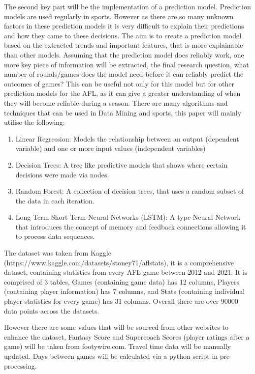 \documentclass{imc-inf}
\begin{document}
	The second key part will be the implementation of a prediction model. Prediction models are used regularly in sports. However as there are so many unknown factors in these prediction models it is very difficult to explain their predictions and how they came to these decisions. The aim is to create a prediction model based on the extracted trends and important features, that is more explainable than other models. 
	Assuming that the prediction model does reliably work, one more key piece of information will be extracted, the final research question, what number of rounds/games does the model need before it can reliably predict the outcomes of games? This can be useful not only for this model but for other prediction models for the AFL, as it can give a greater understanding of when they will become reliable during a season.
	There are many algorithms and techniques that can be used in Data Mining and sports, this paper will mainly utilise the following:
	
	\begin{enumerate}
		\item[] Linear Regression: Models the relationship between an output (dependent variable) and one or more input values (independent variables)
		\item[] Decision Trees: A tree like predictive models that shows where certain decisions were made via nodes.
		\item[] Random Forest: A collection of decision trees, that uses a random subset of the data in each iteration.
		\item[] Long Term Short Term Neural Networks (LSTM): A type Neural Network that introduces the concept of memory and feedback connections allowing it to process data sequences.
	\end{enumerate}
	
	The dataset was taken from Kaggle (https://www.kaggle.com/datasets/stoney71/aflstats), it is a comprehensive dataset, containing statistics from every AFL game between 2012 and 2021. It is comprised of 3 tables, Games (containing game data) has 12 columns, Players (containing player information) has 7 columns, and Stats (containing individual player statistics for every game) has 31 columns. Overall there are over 90000 data points across the datasets.
	
	
	However there are some values that will be sourced from other websites to enhance the dataset, Fantasy Score and Supercoach Scores (player ratings after a game) will be taken from footywire.com. Travel time data will be manually updated. Days between games will be calculated via a python script in pre-processing.
	
\end{document}
